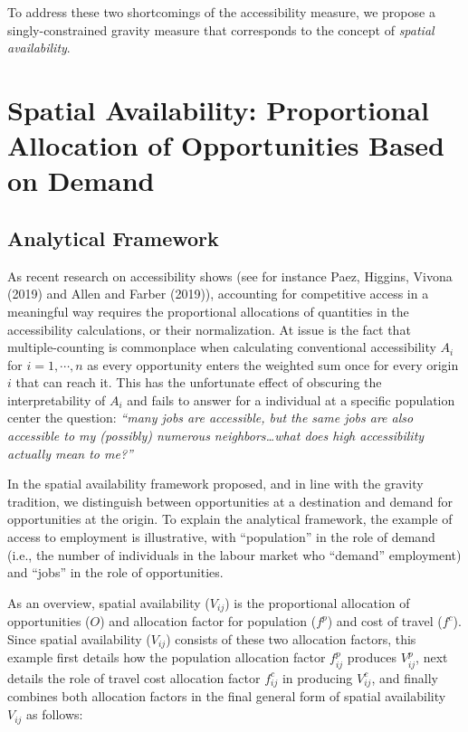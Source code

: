 \documentclass[]{elsarticle} %
\begin{document}
To address these two shortcomings of the accessibility measure, we
propose a singly-constrained gravity measure that corresponds to the
concept of \emph{spatial availability}.

\hypertarget{spatial-availability-proportional-allocation-of-opportunities-based-on-demand}{%
\section{Spatial Availability: Proportional Allocation of Opportunities
Based on
Demand}\label{spatial-availability-proportional-allocation-of-opportunities-based-on-demand}}

\hypertarget{analytical-framework}{%
\subsection{Analytical Framework}\label{analytical-framework}}

As recent research on accessibility shows (see for instance Paez,
Higgins, Vivona (2019) and Allen and Farber (2019)), accounting for
competitive access in a meaningful way requires the proportional
allocations of quantities in the accessibility calculations, or their
normalization. At issue is the fact that multiple-counting is
commonplace when calculating conventional accessibility \(A_i\) for
\(i=1,\cdots,n\) as every opportunity enters the weighted sum once for
every origin \(i\) that can reach it. This has the unfortunate effect of
obscuring the interpretability of \(A_i\) and fails to answer for a
individual at a specific population center the question: \emph{``many
jobs are accessible, but the same jobs are also accessible to my
(possibly) numerous neighbors\ldots what does high accessibility
actually mean to me?''}

In the spatial availability framework proposed, and in line with the
gravity tradition, we distinguish between opportunities at a destination
and demand for opportunities at the origin. To explain the analytical
framework, the example of access to employment is illustrative, with
``population'' in the role of demand (i.e., the number of individuals in
the labour market who ``demand'' employment) and ``jobs'' in the role of
opportunities.

As an overview, spatial availability (\(V_{ij}\)) is the proportional
allocation of opportunities (\(O\)) and allocation factor for population
(\(f^p\)) and cost of travel (\(f^c\)). Since spatial availability
(\(V_{ij}\)) consists of these two allocation factors, this example
first details how the population allocation factor \(f^p_{ij}\) produces
\(V^p_{ij}\), next details the role of travel cost allocation factor
\(f^c_{ij}\) in producing \(V^c_{ij}\), and finally combines both
allocation factors in the final general form of spatial availability
\(V_{ij}\) as follows:
\end{document}
